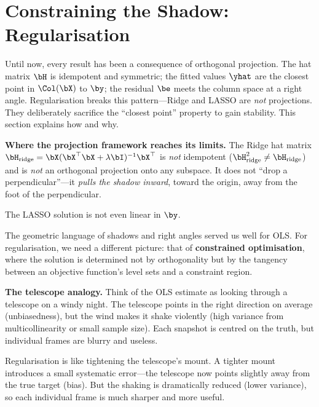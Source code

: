 \section{Constraining the Shadow: Regularisation}\label{sec:regularisation}

Until now, every result has been a consequence of orthogonal projection.
The hat matrix $\bH$ is idempotent and symmetric; the fitted values
$\yhat$ are the closest point in $\Col(\bX)$ to $\by$; the residual
$\be$ meets the column space at a right angle.
Regularisation breaks this pattern---Ridge and LASSO are \emph{not}
projections.
They deliberately sacrifice the ``closest point'' property to gain
stability.
This section explains how and why.

\begin{warning}
\textbf{Where the projection framework reaches its limits.}
The Ridge hat matrix
$\bH_{\text{ridge}} = \bX(\bX^\top\bX+\lambda\bI)^{-1}\bX^\top$
is \emph{not} idempotent
($\bH_{\text{ridge}}^2 \neq \bH_{\text{ridge}}$) and is \emph{not}
an orthogonal projection onto any subspace.
It does not ``drop a perpendicular''---it \emph{pulls the shadow
inward}, toward the origin, away from the foot of the perpendicular.

The LASSO solution is not even linear in $\by$.

The geometric language of shadows and right angles served us well for
OLS\@.  For regularisation, we need a different picture: that of
\textbf{constrained optimisation}, where the solution is determined
not by orthogonality but by the tangency between an objective function's
level sets and a constraint region.
\end{warning}

\medskip
\noindent\textbf{The telescope analogy.}
Think of the OLS estimate as looking through a telescope on a windy night.
The telescope points in the right direction on average (unbiasedness),
but the wind makes it shake violently (high variance from
multicollinearity or small sample size).
Each snapshot is centred on the truth, but individual frames are blurry
and useless.

Regularisation is like tightening the telescope's mount.
A tighter mount introduces a small systematic error---the telescope
now points slightly away from the true target (bias).
But the shaking is dramatically reduced (lower variance), so each
individual frame is much sharper and more useful.

